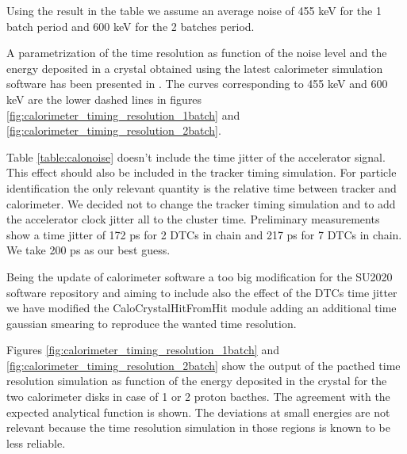 Using the result in the table we assume an average noise of 455 keV for the 1 batch period and 600 keV for the 2 batches period.

A parametrization of the time resolution as function of the noise level and the energy deposited in a crystal obtained using the latest calorimeter simulation software has been presented in \cite{MU2E_36225_CALO_TIME_RES}. The curves corresponding to 455 keV and 600 keV are the lower dashed lines in figures \ref{fig:calorimeter_timing_resolution_1batch} and \ref{fig:calorimeter_timing_resolution_2batch}.

Table \ref{table:calonoise} doesn't include the time jitter of the accelerator signal. This effect should also be included in the tracker timing simulation. For particle identification the only relevant quantity is the relative time between tracker and calorimeter. We decided not to change the tracker timing simulation and to add the accelerator clock jitter all to the cluster time. Preliminary measurements \cite{MU2E_35392_TIME_JITTER} show a time jitter of 172 ps for 2 DTCs in chain and 217 ps for 7 DTCs in chain. We take 200 ps as our best guess.

Being the update of calorimeter software a too big modification for the SU2020 software repository and aiming to include also the effect of the DTCs time jitter we have modified the CaloCrystalHitFromHit module adding an additional time gaussian smearing to reproduce the wanted time resolution.

Figures  \ref{fig:calorimeter_timing_resolution_1batch} and \ref{fig:calorimeter_timing_resolution_2batch} show the output of the pacthed time resolution simulation as function of the energy deposited in the crystal for the two calorimeter disks in case of 1 or 2 proton bacthes. The agreement with the expected analytical function is shown. The deviations at small energies are not relevant because the time resolution simulation in those regions is known to be less reliable.

